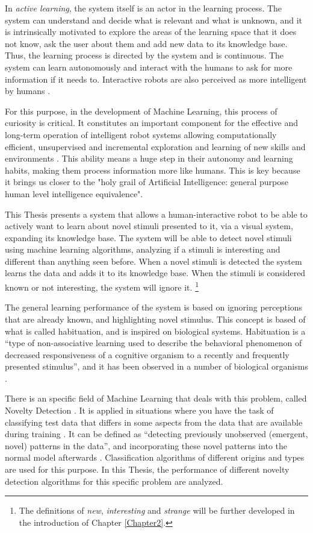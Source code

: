 In \emph{active learning}, the system itself is an actor in the learning process. The system can understand and decide what is relevant and what is unknown, and it is intrinsically motivated to explore the areas of the learning space that it does not know, ask the user about them and add new data to its knowledge base. Thus, the learning process is directed by the system and is continuous. The system can learn autonomously and interact with the humans to ask for more information if it needs to. Interactive robots are also perceived as more intelligent by humans \cite{Cakmak2010}.

For this purpose, in the development of Machine Learning, this process of curiosity is critical. It constitutes an important component for the effective and long-term operation of intelligent robot systems allowing computationally efficient, unsupervised and incremental exploration and learning of new skills and environments \cite{Nehmzow2013}. This ability means a huge step in their autonomy and learning habits, making them process information more like humans. This is key because it brings us closer to the "holy grail of Artificial Intelligence: general purpose human level intelligence equivalence"\cite{Brooks1990}. 

This Thesis presents a system that allows a human-interactive robot to be able to actively want to learn about novel stimuli presented to it, via a visual system, expanding its knowledge base. The system will be able to detect novel stimuli using machine learning algorithms, analyzing if a stimuli is interesting and different than anything seen before. When a novel stimuli is detected the system learns the data and adds it to its knowledge base. When the stimuli is considered known or not interesting, the system will ignore it. \footnote{The definitions of \emph{new}, \emph{interesting} and \emph{strange} will be further developed in the introduction of Chapter \ref{Chapter2}.}

The general learning performance of the system is based on ignoring perceptions that are already known, and highlighting novel stimulus.  This concept is based of what is called habituation, and is inspired on biological systems. Habituation is a “type of non-associative learning used to describe the behavioral phenomenon of decreased responsiveness of a cognitive organism to a recently and frequently presented stimulus”, and it has been observed in a number of biological organisms \cite{Nehmzow2013}.  

There is an specific field of Machine Learning that deals with this problem, called Novelty Detection \cite{Chandola2009}. It is applied in situations where you have the task of classifying test data that differs in some aspects from the data that are available during training \cite{Pimentel2014}. It can be defined as “detecting previously unobserved (emergent, novel) patterns in the data”, and incorporating these novel patterns into the normal model afterwards \cite{Chandola2009}. Classification algorithms of different origins and types are used for this purpose. In this Thesis, the performance of different novelty detection algorithms for this specific problem are analyzed.

